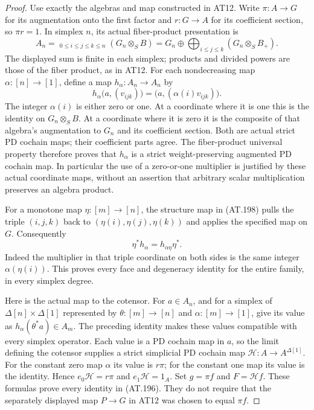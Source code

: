 \begin{proof}
Use exactly the algebras and map constructed in AT12.
Write $\pi:A\to G$ for its augmentation onto the first factor
and $r:G\to A$ for its coefficient section, so $\pi r=1$.
In simplex $n$, its actual fiber-product presentation is
\[
 A_n=\mathop{\prod\nolimits_{G_n}}_{0\leq i\leq j\leq k\leq n}
          (G_n\otimes_S B)
     =G_n\oplus\bigoplus_{i\leq j\leq k}
          (G_n\otimes_S B_+).
 \tag{AT.198}
\]
The displayed sum is finite in each simplex; products and
divided powers are those of the fiber product, as in AT12.
For each nondecreasing map $\alpha:[n]\to[1]$, define a map
$h_\alpha:A_n\to A_n$ by
\[
 h_\alpha\bigl(a,(v_{ijk})\bigr)
       =\bigl(a,(\alpha(i)v_{ijk})\bigr).
 \tag{AT.199}
\]
The integer $\alpha(i)$ is either zero or one.
At a coordinate where it is one this is the identity on
$G_n\otimes_S B$. At a coordinate where it is zero it is
the composite of that algebra's augmentation to $G_n$ and
its coefficient section. Both are actual strict PD cochain
maps; their coefficient parts agree. The fiber-product
universal property therefore proves that $h_\alpha$ is a
strict weight-preserving augmented PD cochain map.
In particular the use of a zero-or-one multiplier is justified
by these actual coordinate maps, without an assertion that
arbitrary scalar multiplication preserves an algebra product.

For a monotone map $\eta:[m]\to[n]$, the structure map in
\textup{(AT.198)} pulls the triple $(i,j,k)$ back to
$(\eta(i),\eta(j),\eta(k))$ and applies the specified map
on $G$. Consequently
\[
       \eta^*h_\alpha=h_{\alpha\eta}\eta^*.
\]
Indeed the multiplier in that triple coordinate on both
sides is the same integer $\alpha(\eta(i))$.
This proves every face and degeneracy identity for the entire
family, in every simplex degree.

Here is the actual map to the cotensor. For $a\in A_n$, and
for a simplex of $\Delta[n]\times\Delta[1]$ represented by
$\theta:[m]\to[n]$ and $\alpha:[m]\to[1]$, give its value as
$h_\alpha(\theta^*a)\in A_m$. The preceding identity makes
these values compatible with every simplex operator. Each
value is a PD cochain map in $a$, so the limit defining the
cotensor supplies a strict simplicial PD cochain map
$\mathcal H:A\to A^{\Delta[1]}$.
For the constant zero map $\alpha$ its value is $r\pi$;
for the constant one map its value is the identity. Hence
$e_0\mathcal H=r\pi$ and $e_1\mathcal H=1_A$.
Set $g=\pi f$ and $F=\mathcal H f$.
These formulas prove every identity in \textup{(AT.196)}.
They do not require that the separately displayed map
$P\to G$ in AT12 was chosen to equal $\pi f$.


\end{proof}
